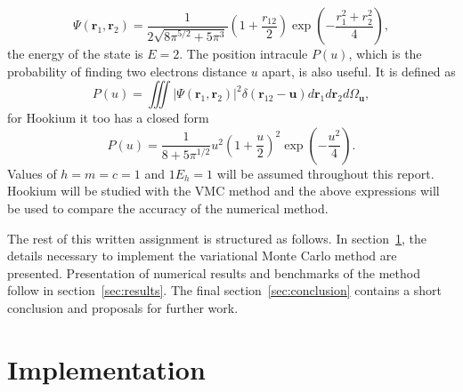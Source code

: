 \documentclass[final,3p,times,twocolumn]{elsarticle}
\begin{document}
	\begin{equation}
		\Psi\left(\mathbf{r}_{1}, \mathbf{r}_{2}\right)=\frac{1}{2 \sqrt{8 \pi^{5 / 2}+5 \pi^{3}}}\left(1+\frac{r_{12}}{2}\right) \exp \left(-\frac{r_{1}^{2}+r_{2}^{2}}{4}\right), 
	\end{equation}
	the energy of the state is $E=2$. 
	The position intracule $P(u)$, which is the probability of finding two electrons distance $u$ apart, is also useful. It is defined as
	\begin{equation}
		P(u)=\iiint\left|\Psi\left(\mathbf{r}_{1}, \mathbf{r}_{2}\right)\right|^{2} \delta\left(\mathbf{r}_{12}-\mathbf{u}\right) d \mathbf{r}_{1} d \mathbf{r}_{2} d \Omega_{\mathbf{u}},
	\end{equation}
	for Hookium it too has a closed form
	\begin{equation}
		P(u)=\frac{1}{8+5 \pi^{1 / 2}} u^{2}\left(1+\frac{u}{2}\right)^{2} \exp \left(-\frac{u^{2}}{4}\right).
	\end{equation}
	Values of $h=m=c=1$ and $1E_h = 1$ will be assumed throughout this report. 
	Hookium will be studied with the VMC method and the above expressions will be used to compare the accuracy of the numerical method.
	
	The rest of this written assignment is structured as follows. In section~\ref{sec:impl}, the details necessary to implement the variational Monte Carlo method are presented. Presentation of numerical results and benchmarks of the method follow in section~\ref{sec:results}. The final section~\ref{sec:conclusion} contains a short conclusion and proposals for further work. 
	\section{Implementation}
	\label{sec:impl}
	
\end{document}
